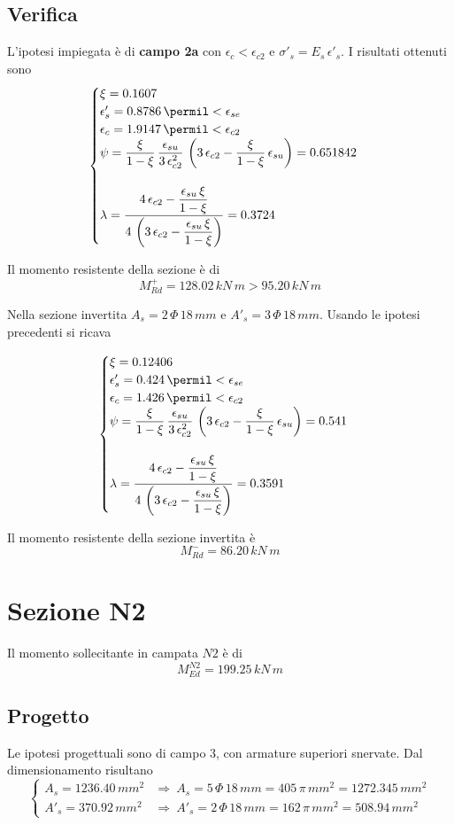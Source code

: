 \subsection{Verifica}
L'ipotesi impiegata è di \textbf{campo 2a} con $\epsilon_c < \epsilon_{c2}$ e $\sigma'_s = E_s\,\epsilon'_s$. I risultati ottenuti sono
\[
\begin{cases}
    \xi = 0.1607\\
	\epsilon'_s = 0.8786\,\permil < \epsilon_{se}\\
	\epsilon_c = 1.9147\,\permil < \epsilon_{c2}\\
	\psi = \dfrac{\xi}{1-\xi}\,\dfrac{\epsilon_{su}}{3\,\epsilon_{c2}^2}\,\left(3\,\epsilon_{c2} - \dfrac{\xi}{1-\xi}\,\epsilon_{su}\right) = 0.651842\\\\
	\lambda = \dfrac{4\,\epsilon_{c2} - \dfrac{\epsilon_{su}\,\xi}{1-\xi}}{4\,\left(3\,\epsilon_{c2} - \dfrac{\epsilon_{su}\,\xi}{1-\xi}\right)} = 0.3724
\end{cases}
\]

Il momento resistente della sezione è di
\[
M_{Rd}^+ = 128.02\,kN\,m > 95.20\,kN\,m
\]

Nella sezione invertita $A_s = 2\,\Phi\,18\,mm$ e $A'_s = 3\,\Phi\,18\,mm$. Usando le ipotesi precedenti si ricava

\[
\begin{cases}
	\xi = 0.12406\\
	\epsilon'_s = 0.424\,\permil<\epsilon_{se}\\
	\epsilon_c = 1.426\,\permil < \epsilon_{c2}\\
	\psi = \dfrac{\xi}{1-\xi}\,\dfrac{\epsilon_{su}}{3\,\epsilon_{c2}^2}\,\left(3\,\epsilon_{c2} - \dfrac{\xi}{1-\xi}\,\epsilon_{su}\right) = 0.541\\\\
	\lambda = \dfrac{4\,\epsilon_{c2} - \dfrac{\epsilon_{su}\,\xi}{1-\xi}}{4\,\left(3\,\epsilon_{c2} - \dfrac{\epsilon_{su}\,\xi}{1-\xi}\right)} = 0.3591
\end{cases}
\]

Il momento resistente della sezione invertita è
\[
M_{Rd}^- = 86.20\,kN\,m
\]

\section{Sezione N2}
Il momento sollecitante in campata $N2$ è di 
\[
M_{Ed}^{N2} = 199.25\,kN\,m
\]
\subsection{Progetto}
Le ipotesi progettuali sono di campo 3, con armature superiori snervate. Dal dimensionamento risultano
\[
\begin{cases}
	A_s = 1236.40\,mm^2 &\Longrightarrow~A_s = 5\,\Phi\,18\,mm = 405\,\pi\,mm^2 = 1272.345\,mm^2\\
	A'_s = 370.92\,mm^2 &\Longrightarrow~ A'_s = 2\,\Phi\,18\,mm = 162\,\pi\,mm^2 = 508.94\,mm^2
\end{cases}
\]

